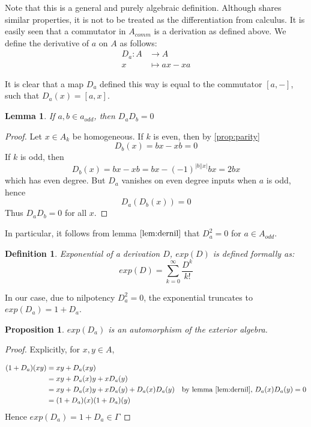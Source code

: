 \documentclass[12pt]{article}
\newtheorem{lemma}[theorem]{Lemma}
\newtheorem{proposition}[theorem]{Proposition}
\newtheorem{definition}[theorem]{Definition}
\numberwithin{theorem}{section}
\numberwithin{equation}{theorem}
\begin{document}
    Note that this is a general and purely algebraic definition. Although shares similar properties, it is not to be treated as the differentiation from calculus. It is easily seen that a commutator in $A_{comm}$ is a derivation as defined above. We define the derivative of $a$ on $A$ as follows:
    \begin{align*}
    D_a : A &\to A \\
    x &\mapsto ax - xa
    \end{align*}
    
    It is clear that a map $D_a$ defined this way is equal to the commutator $[a, -]$, such that $D_a(x) = [a, x]$. 
    
    \begin{lemma}\label{lem:dernil}
    If $a, b \in a_{odd}$, then $D_a D_b = 0$ 
    \end{lemma}
    \begin{proof}
        Let $x \in A_k$ be homogeneous. If $k$ is even, then by \ref{prop:parity}
        $$
        D_b(x) = bx - xb = 0
        $$
        If $k$ is odd, then
        $$
        D_b(x) = bx - xb = bx - (-1)^{|b||x|}bx = 2bx
        $$
        which has even degree. But $D_a$ vanishes on even degree inputs when $a$ is odd, hence $$
        D_a(D_b(x)) = 0
        $$
        Thus $D_aD_b = 0$ for all $x$.
    \end{proof}

    In particular, it follows from lemma $\ref{lem:dernil}$ that $D_a^2 = 0$ for $a \in A_{odd}$.

    \begin{definition}
        Exponential of a derivation $D$, $exp(D)$ is defined formally as:
        $$
        exp(D) = \sum_{k=0}^\infty \frac{D^k}{k!}
        $$
    \end{definition}
    In our case, due to nilpotency $D_a^2 = 0$, the exponential truncates to $exp(D_a) = 1 + D_a$.

    \begin{proposition}
        $exp(D_a)$ is an automorphism of the exterior algebra.
    \end{proposition}
    \begin{proof}
        Explicitly, for $x, y \in A$,

        \begin{align*} 
            (1+D_a)(xy)
            &= xy + D_a(xy)\\
            &= xy + D_a(x)y + xD_a(y)\\
            &= xy + D_a(x)y + xD_a(y) + D_a(x)D_a(y) & \text{by lemma \ref{lem:dernil}, $D_a(x)D_a(y) = 0$}\\
            &= (1+D_a)(x) (1+D_a)(y)
        \end{align*}
        Hence $exp(D_a) = 1 + D_a \in \Gamma$
    \end{proof}
\end{document}
